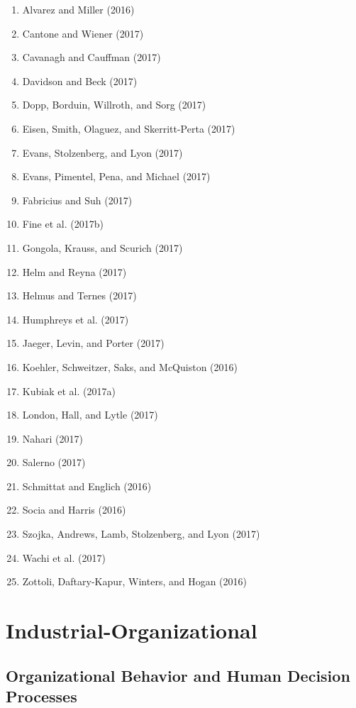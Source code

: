 \documentclass[english,man]{apa6}
\providecommand{\tightlist}{%
  \setlength{\itemsep}{0pt}\setlength{\parskip}{0pt}}
\theoremstyle{definition}
\theoremstyle{definition}
\theoremstyle{definition}
\theoremstyle{remark}
\begin{document}
\begin{enumerate}
\def\labelenumi{\arabic{enumi})}
\tightlist
\item
  Alvarez and Miller (2016)
\item
  Cantone and Wiener (2017)
\item
  Cavanagh and Cauffman (2017)
\item
  Davidson and Beck (2017)
\item
  Dopp, Borduin, Willroth, and Sorg (2017)
\item
  Eisen, Smith, Olaguez, and Skerritt-Perta (2017)
\item
  Evans, Stolzenberg, and Lyon (2017)
\item
  Evans, Pimentel, Pena, and Michael (2017)
\item
  Fabricius and Suh (2017)
\item
  Fine et al. (2017b)
\item
  Gongola, Krauss, and Scurich (2017)
\item
  Helm and Reyna (2017)
\item
  Helmus and Ternes (2017)
\item
  Humphreys et al. (2017)
\item
  Jaeger, Levin, and Porter (2017)
\item
  Koehler, Schweitzer, Saks, and McQuiston (2016)
\item
  Kubiak et al. (2017a)
\item
  London, Hall, and Lytle (2017)
\item
  Nahari (2017)
\item
  Salerno (2017)
\item
  Schmittat and Englich (2016)
\item
  Socia and Harris (2016)
\item
  Szojka, Andrews, Lamb, Stolzenberg, and Lyon (2017)
\item
  Wachi et al. (2017)
\item
  Zottoli, Daftary-Kapur, Winters, and Hogan (2016)
\end{enumerate}

\section{Industrial-Organizational}\label{industrial-organizational}

\subsection{Organizational Behavior and Human Decision
Processes}\label{organizational-behavior-and-human-decision-processes}
\end{document}
